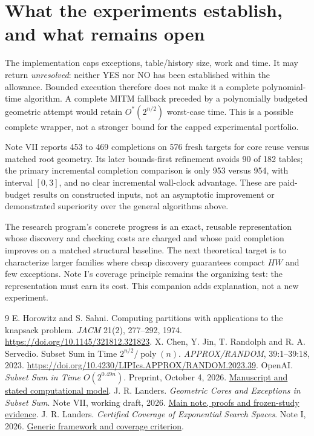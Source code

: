 \documentclass[10pt,english]{article}
\newcommand{\poly}{\operatorname{poly}}
\begin{document}
\section{What the experiments establish, and what remains open}
The implementation caps exceptions, table/history size, work and time. It may return \emph{unresolved}: neither YES nor NO has been established within the allowance. Bounded execution therefore does not make it a complete polynomial-time algorithm. A complete MITM fallback preceded by a polynomially budgeted geometric attempt would retain $O^*(2^{n/2})$ worst-case time. This is a possible complete wrapper, not a stronger bound for the capped experimental portfolio.

Note VII reports 453 to 469 completions on 576 fresh targets for core reuse versus matched root geometry. Its later bounds-first refinement avoids 90 of 182 tables; the primary incremental completion comparison is only 953 versus 954, with interval $[0,3]$, and no clear incremental wall-clock advantage. These are paid-budget results on constructed inputs, not an asymptotic improvement or demonstrated superiority over the general algorithms above.

The research program's concrete progress is an exact, reusable representation whose discovery and checking costs are charged and whose paid completion improves on a matched structural baseline. The next theoretical target is to characterize larger families where cheap discovery guarantees compact $HW$ and few exceptions. Note I's coverage principle remains the organizing test: the representation must earn its cost. This companion adds explanation, not a new experiment.

\begingroup\footnotesize
\begin{thebibliography}{9}
\setlength{\itemsep}{1pt}\setlength{\parskip}{1pt}
 E. Horowitz and S. Sahni. Computing partitions with applications to the knapsack problem. \emph{JACM} 21(2), 277--292, 1974. \url{https://doi.org/10.1145/321812.321823}.
 X. Chen, Y. Jin, T. Randolph and R. A. Servedio. Subset Sum in Time $2^{n/2}/\poly(n)$. \emph{APPROX/RANDOM}, 39:1--39:18, 2023. \url{https://doi.org/10.4230/LIPIcs.APPROX/RANDOM.2023.39}.
 OpenAI. \emph{Subset Sum in Time $O(2^{0.49n})$}. Preprint, October 4, 2026. \href{https://github.com/openai/math/blob/main/preprints/Subset-Sum-in-Time-2-power-0-49n-October-4-2026/subset-sum.pdf}{Manuscript and stated computational model}.
 J. R. Landers. \emph{Geometric Cores and Exceptions in Subset Sum}. Note VII, working draft, 2026. \href{Geometric_Cores_and_Exceptions_in_Subset_Sum.pdf}{Main note, proofs and frozen-study evidence}.
 J. R. Landers. \emph{Certified Coverage of Exponential Search Spaces}. Note I, 2026. \href{../01-certified-coverage/Certified_Coverage_of_Exponential_Search_Spaces.pdf}{Generic framework and coverage criterion}.
\end{thebibliography}
\endgroup
\end{document}
